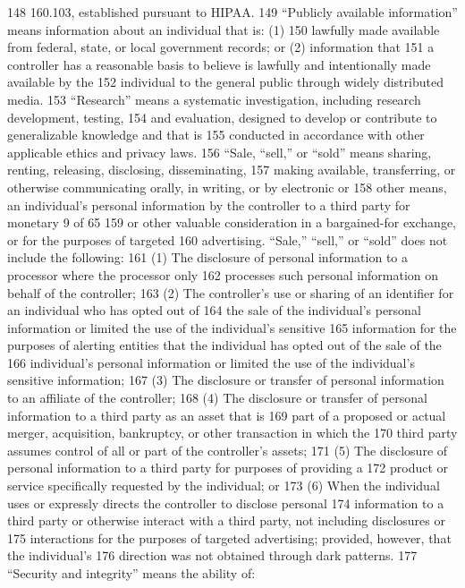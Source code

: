 148 160.103, established pursuant to HIPAA.
149 “Publicly available information” means information about an individual that is: (1)
150 lawfully made available from federal, state, or local government records; or (2) information that
151 a controller has a reasonable basis to believe is lawfully and intentionally made available by the
152 individual to the general public through widely distributed media.
153 “Research” means a systematic investigation, including research development, testing,
154 and evaluation, designed to develop or contribute to generalizable knowledge and that is
155 conducted in accordance with other applicable ethics and privacy laws.
156 “Sale, “sell,” or “sold” means sharing, renting, releasing, disclosing, disseminating,
157 making available, transferring, or otherwise communicating orally, in writing, or by electronic or
158 other means, an individual’s personal information by the controller to a third party for monetary
9 of 65
159 or other valuable consideration in a bargained-for exchange, or for the purposes of targeted
160 advertising. “Sale,” “sell,” or “sold” does not include the following:
161 (1) The disclosure of personal information to a processor where the processor only
162 processes such personal information on behalf of the controller;
163 (2) The controller’s use or sharing of an identifier for an individual who has opted out of
164 the sale of the individual’s personal information or limited the use of the individual’s sensitive
165 information for the purposes of alerting entities that the individual has opted out of the sale of the
166 individual’s personal information or limited the use of the individual’s sensitive information;
167 (3) The disclosure or transfer of personal information to an affiliate of the controller;
168 (4) The disclosure or transfer of personal information to a third party as an asset that is
169 part of a proposed or actual merger, acquisition, bankruptcy, or other transaction in which the
170 third party assumes control of all or part of the controller’s assets;
171 (5) The disclosure of personal information to a third party for purposes of providing a
172 product or service specifically requested by the individual; or
173 (6) When the individual uses or expressly directs the controller to disclose personal
174 information to a third party or otherwise interact with a third party, not including disclosures or
175 interactions for the purposes of targeted advertising; provided, however, that the individual’s
176 direction was not obtained through dark patterns.
177 “Security and integrity” means the ability of:
